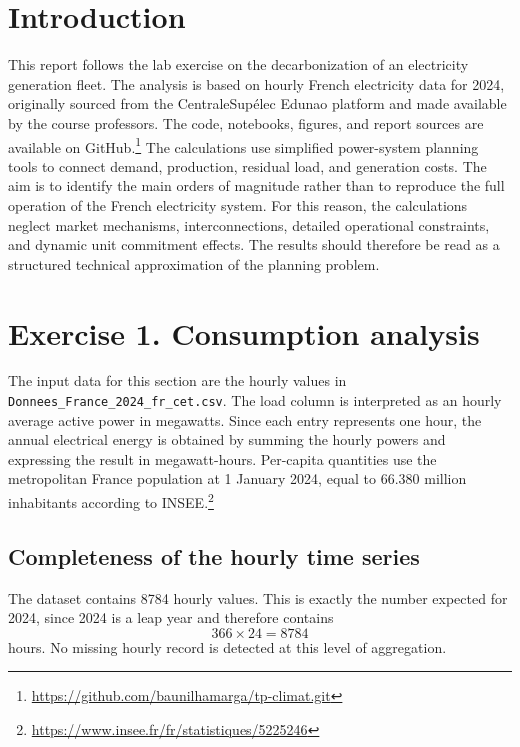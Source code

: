 \documentclass[a4paper]{report}
\begin{document}



\section*{Introduction}

This report follows the lab exercise on the decarbonization of an electricity generation fleet. The analysis is based on hourly French electricity data for 2024, originally sourced from the CentraleSupélec Edunao platform and made available by the course professors. The code, notebooks, figures, and report sources are available on GitHub.\footnote{\url{https://github.com/baunilhamarga/tp-climat.git}} The calculations use simplified power-system planning tools to connect demand, production, residual load, and generation costs. The aim is to identify the main orders of magnitude rather than to reproduce the full operation of the French electricity system. For this reason, the calculations neglect market mechanisms, interconnections, detailed operational constraints, and dynamic unit commitment effects. The results should therefore be read as a structured technical approximation of the planning problem.

\section{Exercise 1. Consumption analysis}

The input data for this section are the hourly values in \texttt{Donnees\_France\_2024\_fr\_cet.csv}. The load column is interpreted as an hourly average active power in megawatts. Since each entry represents one hour, the annual electrical energy is obtained by summing the hourly powers and expressing the result in megawatt-hours. Per-capita quantities use the metropolitan France population at 1 January 2024, equal to 66.380 million inhabitants according to INSEE.\footnote{\url{https://www.insee.fr/fr/statistiques/5225246}}

\subsection{Completeness of the hourly time series}

The dataset contains 8784 hourly values. This is exactly the number expected for 2024, since 2024 is a leap year and therefore contains
\[
366 \times 24 = 8784
\]
hours. No missing hourly record is detected at this level of aggregation.
\end{document}
